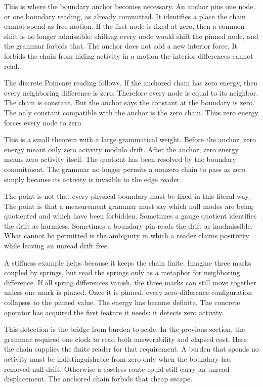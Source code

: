 This is where the boundary anchor becomes necessary. An anchor pins one
node, or one boundary reading, as already committed. It identifies a place
the chain cannot spend as free motion. If the first node is fixed at zero,
then a common shift is no longer admissible: shifting every node would shift
the pinned node, and the grammar forbids that. The anchor does not add a new
interior force. It forbids the chain from hiding activity in a motion the
interior differences cannot read.

The discrete Poincare reading follows. If the anchored chain has zero
energy, then every neighboring difference is zero. Therefore every node is
equal to its neighbor. The chain is constant. But the anchor says the
constant at the boundary is zero. The only constant compatible with the
anchor is the zero chain. Thus zero energy forces every node to zero.

This is a small theorem with a large grammatical weight. Before the anchor,
zero energy meant only zero activity modulo drift. After the anchor, zero
energy means zero activity itself. The quotient has been resolved by the
boundary commitment. The grammar no longer permits a nonzero chain to pass
as zero simply because its activity is invisible to the edge reader.

The point is not that every physical boundary must be fixed in this literal
way. The point is that a measurement grammar must say which null modes are
being quotiented and which have been forbidden. Sometimes a gauge quotient
identifies the drift as harmless. Sometimes a boundary pin reads the drift
as inadmissible. What cannot be permitted is the ambiguity in which a reader
claims positivity while leaving an unread drift free.

A stiffness example helps because it keeps the chain finite. Imagine three
marks coupled by springs, but read the springs only as a metaphor for
neighboring difference. If all spring differences vanish, the three marks
can still move together unless one mark is pinned. Once it is pinned, every
zero-difference configuration collapses to the pinned value. The energy has
become definite. The concrete operator has acquired the first feature it
needs: it detects zero activity.

This detection is the bridge from burden to scale. In the previous section,
the grammar required one clock to read both answerability and elapsed cost.
Here the chain supplies the finite reader for that requirement. A burden
that spends no activity must be indistinguishable from zero only when the
boundary has removed null drift. Otherwise a costless route could still
carry an unread displacement. The anchored chain forbids that cheap escape.

